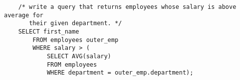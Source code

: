 \documentclass[11pt, a4paper]{article}
\begin{document}
\begin{spacing}{1.1}
\begin{lstlisting}
	/* write a query that returns employees whose salary is above average for 
	   their given department. */
	SELECT first_name
		FROM employees outer_emp
		WHERE salary > (
			SELECT AVG(salary)
			FROM employees
			WHERE department = outer_emp.department); \end{lstlisting} \vspace*{3mm}
	
	
	
	
\end{spacing}
\end{document}
